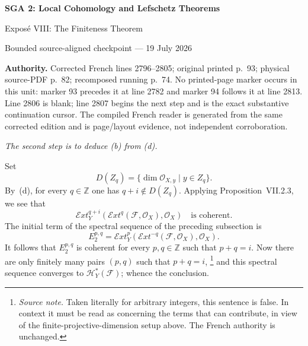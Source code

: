 \documentclass[10pt,a4paper]{article}
\newcommand{\cF}{\mathcal F}
\newcommand{\cO}{\mathcal O}
\newcommand{\sExt}{\mathcal E\!xt}
\newcommand{\sH}{\mathcal H}
\newcommand{\markedfootnote}[2]{%
  \begingroup\renewcommand{\thefootnote}{#1}\footnote{#2}\endgroup}
\begin{document}
\begin{center}
  {\Large\bfseries SGA 2: Local Cohomology and Lefschetz Theorems}\par\smallskip
  {\large Expos\'e VIII: The Finiteness Theorem}\par
  \small Bounded source-aligned checkpoint --- 19 July 2026
\end{center}
\noindent\colorbox{softgray}{\parbox{0.95\linewidth}{\footnotesize\textbf{Authority.}
Corrected French lines 2796--2805; original printed p.~93; physical
source-PDF p.~82; recomposed running p.~74. No printed-page marker occurs in
this unit: marker 93 precedes it at line 2782 and marker 94 follows it at line
2813. Line 2806 is blank; line 2807 begins the next step and is the exact
substantive continuation cursor. The compiled French reader is generated from
the same corrected edition and is page/layout evidence, not independent
corroboration.}}

\medskip
\noindent\textit{The second step is to deduce \textup{(b)} from
\textup{(d)}.}

\medskip
Set
\[
  D(Z_q)=\{\dim\cO_{X,y}\mid y\in Z_q\}.
\]
By~\textup{(d)}, for every $q\in\mathbb Z$ one has
$q+i\notin D(Z_q)$. Applying Proposition~VII.2.3, we see that
\[
  \sExt_Y^{q+i}(\sExt^q(\cF,\cO_X),\cO_X)
  \quad\text{is coherent.}
\]
The initial term of the spectral sequence of the preceding subsection is
\[
  E_2^{p,q}
  =\sExt_Y^p(\sExt^{-q}(\cF,\cO_X),\cO_X).
\]
It follows that $E_2^{p,q}$ is coherent for every $p,q\in\mathbb Z$ such
that $p+q=i$. Now there are only finitely many pairs $(p,q)$ such that
$p+q=i$,\markedfootnote{[S]}{\textit{Source note.} Taken literally for
arbitrary integers, this sentence is false. In context it must be read as
concerning the terms that can contribute, in view of the finite-projective-dimension
setup above. The French authority is unchanged.} and this spectral
sequence converges to $\sH_Y^\ast(\cF)$; whence the conclusion.
\end{document}
